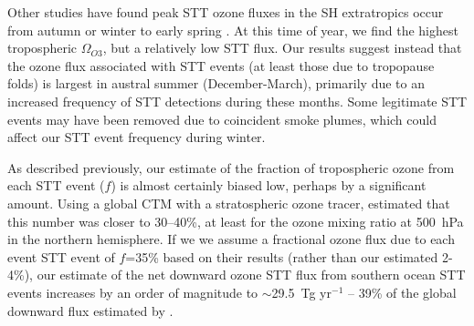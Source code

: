 \documentclass{article}
\begin{document}
  Other studies have found peak STT ozone fluxes in the SH extratropics occur from autumn or winter to early spring \citep{Olsen2003, Liu2016}. 
  At this time of year, we find the highest tropospheric $\Omega_{O3}$, but a relatively low STT flux.
  Our results suggest instead that the ozone flux associated with STT events (at least those due to tropopause folds) is largest in austral summer (December-March), primarily due to an increased frequency of STT detections during these months.
  Some legitimate STT events may have been removed due to coincident smoke plumes, which could affect our STT event frequency during winter.
  

  As described previously, our estimate of the fraction of tropospheric ozone from each STT event ($f$) is almost certainly biased low, perhaps by a significant amount. 
  Using a global CTM with a stratospheric ozone tracer, \citet{Terao2008} estimated that this number was closer to 30--40\%, at least for the ozone mixing ratio at 500~hPa in the northern hemisphere.
  If we we assume a fractional ozone flux due to each event STT event of $f$=35\% based on their results (rather than our estimated 2-4\%), our estimate of the net downward ozone STT flux from southern ocean STT events increases by an order of magnitude to $\sim$29.5~Tg yr$^{-1}$ -- 39\% of the global downward flux estimated by \citet{Sprenger2003}.
\end{document}
